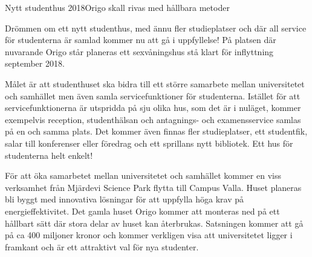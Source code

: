 \begin{news}{2}{Nytt studenthus 2018}{Origo skall rivas med hållbara metoder}{}{}

Drömmen om ett nytt studenthus, med ännu fler studieplatser och där
all service för studenterna är samlad kommer nu att gå i
uppfyllelse! På platsen där nuvarande Origo står planeras ett
sexvåningshus stå klart för inflyttning september 2018.


Målet är att studenthuset ska bidra till ett större samarbete mellan
universitetet och samhället men även samla servicefunktioner för
studenterna. Istället för att servicefunktionerna är utspridda på sju
olika hus, som det är i nuläget, kommer exempelvis reception,
studenthälsan och antagnings- och examensservice samlas på en och
samma plats. Det kommer även finnas fler studieplatser, ett
studentfik, salar till konferenser eller föredrag och ett sprillans
nytt bibliotek. Ett hus för studenterna helt enkelt!

För att öka samarbetet mellan universitetet och samhället kommer en
viss verksamhet från Mjärdevi Science Park flytta till Campus
Valla. Huset planeras bli byggt med innovativa lösningar för att
uppfylla höga krav på energieffektivitet. Det gamla huset Origo kommer
att monteras ned på ett hållbart sätt där stora delar av huset kan
återbrukas. Satsningen kommer att gå på ca 400 miljoner kronor och
kommer verkligen visa att universitetet ligger i framkant och är ett
attraktivt val för nya studenter.



\end{news}
